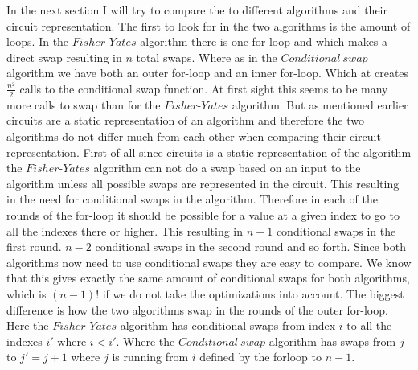 \bigskip
In the next section I will try to compare the to different algorithms and their circuit representation. The first to look for in the two algorithms is the amount of loops. In the $Fisher\text{-}Yates$ algorithm there is one for-loop and which makes a direct swap resulting in $n$ total swaps. Where as in the $Conditional~swap$ algorithm we have both an outer for-loop and an inner for-loop. Which at creates $\frac{n^2}{2}$ calls to the conditional swap function. At first sight this seems to be many more calls to swap than for the $Fisher\text{-}Yates$ algorithm. But as mentioned earlier circuits are a static representation of an algorithm and therefore the two algorithms do not differ much from each other when comparing their circuit representation. First of all since circuits is a static representation of the algorithm the $Fisher\text{-}Yates$ algorithm can not do a swap based on an input to the algorithm unless all possible swaps are represented in the circuit. This resulting in the need for conditional swaps in the algorithm. Therefore in each of the rounds of the for-loop it should be possible for a value at a given index to go to all the indexes there or higher. This resulting in $n-1$ conditional swaps in the first round. $n-2$ conditional swaps in the second round and so forth. Since both algorithms now need to use conditional swaps they are easy to compare. We know that this gives exactly the same amount of conditional swaps for both algorithms, which is $(n-1)!$ if we do not take the optimizations into account. The biggest difference is how the two algorithms swap in the rounds of the outer for-loop. Here the $Fisher\text{-}Yates$ algorithm has conditional swaps from index $i$ to all the indexes $i'$ where $i<i'$. Where the $Conditional~swap$ algorithm has swaps from $j$ to $j'= j+1$ where $j$ is running from $i$ defined by the forloop to $n-1$.

